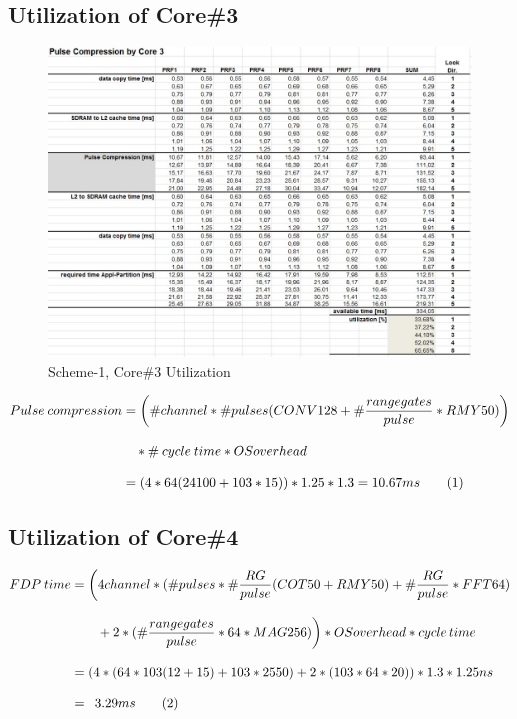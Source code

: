 \subsection{Utilization of Core\#3}
\begin{figure}[h!]
	\centering
	\includegraphics[width=160mm]{figures/aa_scheme1_cpu_util_3}
	\caption{Scheme-1, Core\#3 Utilization}
	\label{fig:existing_analysis:aa_scheme1_cpu_util3}
\end{figure}
\begin{align*}
	\label{aa:scheme1:core3:equ}
	Pulse \: compression &= \bigg(\#channel * \#pulses (CONV128 +  \# \frac{range gates}{pulse} * RMY50)\bigg)\\[0.3cm]  
	& \quad * \# \: cycle \: time * OSoverhead\\[0.3cm] 
	&= (4 * 64 (24100 + 103 * 15)) * 1.25 * 1.3 = 10.67ms   \stepcounter{equation}\tag{\theequation} 
\end{align*}

\FloatBarrier
\subsection{Utilization of Core\#4}
\begin{align*}
	\label{aa:scheme1:core4:equ1}
	FDP \: time &= \bigg(4channel * (\#pulses * \# \frac{RG}{pulse} (COT50 + RMY50) + \# \frac{RG}{pulse} * FFT64) \\[0.3cm] 
	& \qquad + 2 * (\# \frac{range gates}{pulse} * 64 * MAG256)\bigg) * OSoverhead * cycle \, time \\[0.3cm]
	&= (4 * (64 * 103 (12 + 15) + 103 * 2550) + 2 * (103 * 64 * 20)) * 1.3 * 1.25ns \enspace \\[0.3cm]
	&= \enspace 3.29ms  \stepcounter{equation}\tag{\theequation} 
\end{align*}

